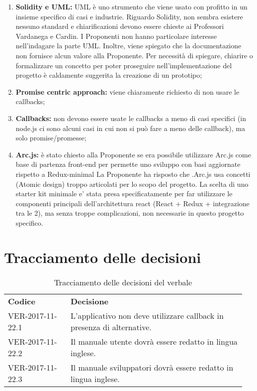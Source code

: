 \documentclass[VER-2017-11-22.tex]{subfiles}
\begin{document}
\begin{enumerate}
	\item \textbf{Solidity e UML:} UML è uno strumento che viene usato con profitto in un insieme specifico di casi e industrie. Riguardo Solidity, non sembra esistere nessuno standard e chiarificazioni devono essere chieste ai Professori Vardanega e Cardin. I Proponenti non hanno particolare interesse nell'indagare la parte UML. Inoltre, viene spiegato che la documentazione non fornisce alcun valore alla Proponente. Per necessità di spiegare, chiarire o formalizzare un concetto per poter proseguire nell'implementazione del progetto è caldamente suggerita la creazione di un prototipo;
	
	\item \textbf{Promise centric approach:} viene chiaramente richiesto di non usare le callbacks;
	
	\item \textbf{Callbacks:} non devono essere usate le callbacks a meno di casi specifici (in node.js ci sono alcuni casi in cui non si può fare a meno delle callback), ma solo promise/promesse;
	
	\item \textbf{Arc.js:} è stato chiesto alla Proponente se era possibile utilizzare Arc.js come base di partenza front-end per permette uno sviluppo con basi aggiornate rispetto a Redux-minimal La Proponente ha risposto che .Arc.js usa concetti (Atomic design) troppo articolati per lo scopo del progetto. La scelta di uno starter kit minimale e' stata presa specificatamente per far utilizzare le  componenti principali dell'architettura react (React + Redux + integrazione tra le 2), ma senza troppe complicazioni, non necessarie in questo progetto specifico.
\end{enumerate}
\section{Tracciamento delle decisioni}
\begin{table}[H]
	\begin{center}
		\begin{tabu} to 
			\tableHeaderStyle
			\textbf{Codice} & \textbf{Decisione} \\
			VER-2017-11-22.1 & L'applicativo non deve utilizzare callback in presenza di alternative. \\
			VER-2017-11-22.2 & Il manuale utente dovrà essere redatto in lingua inglese. \\
			VER-2017-11-22.3 & Il manuale sviluppatori dovrà essere redatto in lingua inglese. \\
		\end{tabu}
		\caption{Tracciamento delle decisioni del verbale}
	\end{center}
\end{table}
\end{document}
